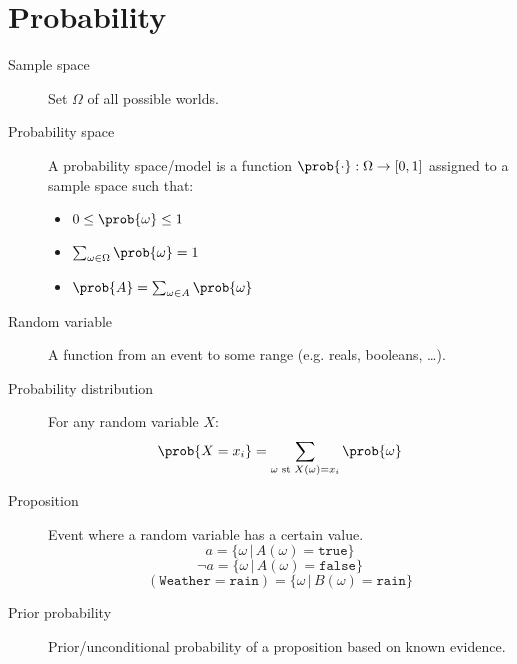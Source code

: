 \chapter{Probability}

\begin{description}
    \item[Sample space] 
        Set $\Omega$ of all possible worlds.

    \item[Probability space] 
        A probability space/model is a function $\prob{\cdot}: \Omega \rightarrow [0, 1]$ assigned to a sample space such that:
        \begin{itemize}
            \item $0 \leq \prob{\omega} \leq 1$
            \item $\sum_{\omega \in \Omega} \prob{\omega} = 1$
            \item $\prob{A} = \sum_{\omega \in A} \prob{\omega}$
        \end{itemize}

    \item[Random variable] 
        A function from an event to some range (e.g. reals, booleans, \dots).

    \item[Probability distribution] 
        For any random variable $X$:
        \[ \prob{X = x_i} = \sum_{\omega \text{ st } X(\omega)=x_i} \prob{\omega} \]

    \item[Proposition] 
        Event where a random variable has a certain value.
        \[ a = \{ \omega \,\vert\, A(\omega) = \texttt{true} \} \]
        \[ \lnot  a = \{ \omega \,\vert\, A(\omega) = \texttt{false} \} \]
        \[ (\texttt{Weather} = \texttt{rain}) = \{ \omega \,\vert\, B(\omega) = \texttt{rain} \} \]

    \item[Prior probability] 
        Prior/unconditional probability of a proposition based on known evidence.
        

\end{description}
